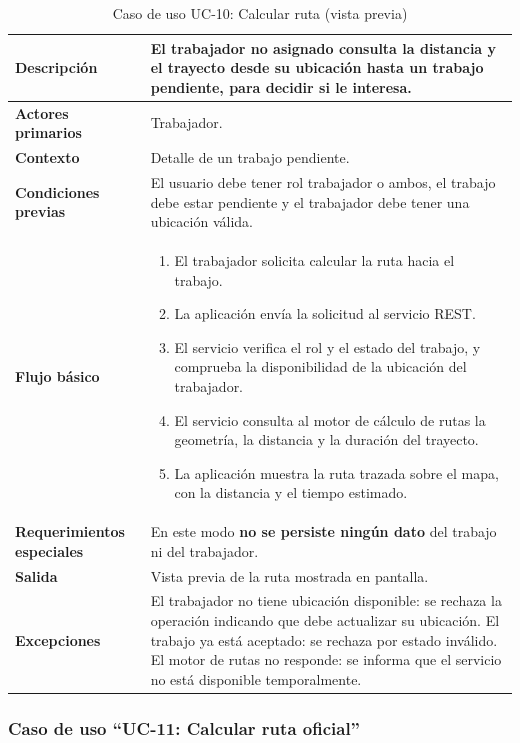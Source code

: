 \documentclass[doc,12pt,a4paper]{apa7}
\begin{document}
\begin{longtable}{|P{3.3cm}|L{11.2cm}|}
\caption{Caso de uso UC-10: Calcular ruta (vista previa)}\\
\hline
\textbf{Descripción} & El trabajador no asignado consulta la distancia y el trayecto desde su ubicación hasta un trabajo pendiente, para decidir si le interesa. \\ \hline
\textbf{Actores primarios} & Trabajador. \\ \hline
\textbf{Contexto} & Detalle de un trabajo pendiente. \\ \hline
\textbf{Condiciones previas} & El usuario debe tener rol trabajador o ambos, el trabajo debe estar pendiente y el trabajador debe tener una ubicación válida. \\ \hline
\textbf{Flujo básico} &
\begin{enumerate}
    \item El trabajador solicita calcular la ruta hacia el trabajo.
    \item La aplicación envía la solicitud al servicio REST.
    \item El servicio verifica el rol y el estado del trabajo, y comprueba la disponibilidad de la ubicación del trabajador.
    \item El servicio consulta al motor de cálculo de rutas la geometría, la distancia y la duración del trayecto.
    \item La aplicación muestra la ruta trazada sobre el mapa, con la distancia y el tiempo estimado.
\end{enumerate} \\ \hline
\textbf{Requerimientos especiales} & En este modo \textbf{no se persiste ningún dato} del trabajo ni del trabajador. \\ \hline
\textbf{Salida} & Vista previa de la ruta mostrada en pantalla. \\ \hline
\textbf{Excepciones} & El trabajador no tiene ubicación disponible: se rechaza la operación indicando que debe actualizar su ubicación. El trabajo ya está aceptado: se rechaza por estado inválido. El motor de rutas no responde: se informa que el servicio no está disponible temporalmente. \\ \hline
\end{longtable}

\subsubsection{Caso de uso ``UC-11: Calcular ruta oficial''}
\end{document}
